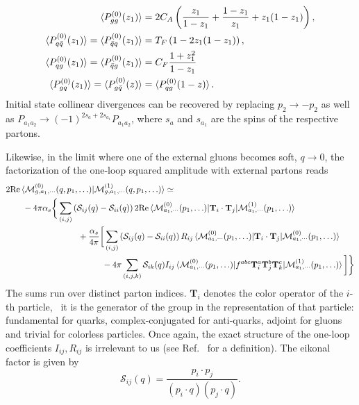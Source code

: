 \begin{equation}
\begin{split}
\braket{P_{gg}^{(0)}(z_1)} &= 2 C_A \left( \frac{z_1}{1 - z_1} + \frac{1 - z_1}{z_1} + z_1 (1 - z_1) \right), \\
\braket{P_{q \bar{q}}^{(0)} (z_1)} = \braket{P_{\bar{q}q}^{(0)} (z_1)} &= T_F \left(1 - 2 z_1 (1 - z_1) \right), \\
\braket{P_{qg}^{(0)}(z_1)} = \braket{P_{\bar{q}g}^{(0)}(z_1)} &= C_F \frac{1 + z_1^2}{1 - z_1} \\
\braket{P^{(0)}_{gq}(z_1)} = \braket{P_{g\bar{q}}^{(0)}(z)} &= \braket{P_{qg}^{(0)} (1 - z)}.
\end{split}
\end{equation}
Initial state collinear divergences can be recovered by replacing $p_2 \rightarrow - p_2$ as well as $P_{a_1 a_2} \rightarrow (-1)^{2 s_a + 2 s_{a_1}} P_{a_1 a_2}$, where $s_a$ and $s_{a_1}$ are the spins of the respective partons.

Likewise, in the limit where one of the external gluons becomes soft, $q \rightarrow 0$, the factorization of the one-loop squared amplitude with external partons reads
\begin{equation}
\begin{split}
&2 \text{Re} \braket{\mathcal{M}^{(0)}_{g,a_1,\cdots} (q, p_1, \ldots)|\mathcal{M}^{(1)}_{g,a_1,\cdots} (q, p_1, \ldots)} \simeq \\
&\qquad - 4 \pi \alphas \bigg \lbrace \sum_{(i,j)} \left( \mathcal{S}_{ij}(q) - \mathcal{S}_{ii}(q) \right) 2 \text{Re} \braket{\mathcal{M}^{(0)}_{a_1,\cdots} ( p_1, \ldots)| \mathbf{T}_i \cdot \mathbf{T}_j|\mathcal{M}^{(1)}_{a_1,\cdots} (p_1, \ldots)}  \\
& \hspace{3cm} + \frac{\alphas}{4 \pi} \bigg [ \sum_{(i,j)} \left( \mathcal{S}_{ij}(q) - \mathcal{S}_{ii}(q) \right) R_{ij} \braket{\mathcal{M}^{(0)}_{a_1,\cdots} ( p_1, \ldots)| \mathbf{T}_i \cdot \mathbf{T}_j|\mathcal{M}^{(0)}_{a_1,\cdots} (p_1, \ldots)}  \\
& \hspace{4cm}  - 4 \pi \sum_{(i,j,k)} \mathcal{S}_{ik} (q) I_{ij} \braket{\mathcal{M}^{(0)}_{a_1,\cdots} ( p_1, \ldots)| f^{abc} \mathbf{T}_i^a \mathbf{T}_j^b \mathbf{T}_k^c|\mathcal{M}^{(1)}_{a_1,\cdots} (p_1, \ldots)} \bigg ] \bigg \rbrace
\end{split}
\label{eq:5:soft_limit}
\end{equation}
The sums run over distinct parton indices. $\mathbf{T}_i$ denotes the color operator of the $i$-th particle, \ie\ it is the generator of the  group in the representation of that particle: fundamental for quarks, complex-conjugated for anti-quarks, adjoint for gluons and trivial for colorless particles. Once again, the exact structure of the one-loop coefficients $I_{ij}, R_{ij}$ is irrelevant to us (see Ref.~\cite{Czakon:2015exa} for a definition). The eikonal factor is given by
\begin{equation}
\mathcal{S}_{ij}(q) = \frac{p_i \cdot p_j}{(p_i \cdot q) (p_j \cdot q)}.
\end{equation}

